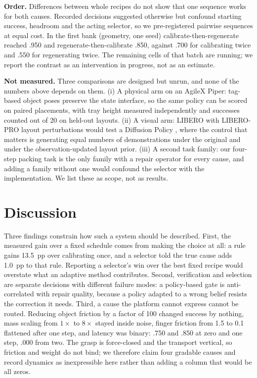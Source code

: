 \documentclass[conference]{IEEEtran}
\begin{document}
\textbf{Order.} Differences between whole recipes do not show that one sequence works for both causes. Recorded decisions suggested otherwise but confound starting success, headroom and the acting selector, so we pre-registered pairwise sequences at equal cost. In the first bank (geometry, one seed) calibrate-then-regenerate reached .950 and regenerate-then-calibrate .850, against .700 for calibrating twice and .550 for regenerating twice. The remaining cells of that batch are running; we report the contrast as an intervention in progress, not as an estimate.

\textbf{Not measured.} Three comparisons are designed but unrun, and none of the numbers above depends on them. (i) A physical arm on an AgileX Piper: tag-based object poses preserve the state interface, so the same policy can be scored on paired placements, with tray height measured independently and successes counted out of 20 on held-out layouts. (ii) A visual arm: LIBERO with LIBERO-PRO layout perturbations \cite{libero,liberopro} would test a Diffusion Policy \cite{chi2023diffusion}, where the control that matters is generating equal numbers of demonstrations under the original and under the observation-updated layout prior. (iii) A second task family: our four-step packing task is the only family with a repair operator for every cause, and adding a family without one would confound the selector with the implementation. We list these as scope, not as results.

\section{Discussion}
Three findings constrain how such a system should be described. First, the measured gain over a fixed schedule comes from making the choice at all: a rule gains 13.5~pp over calibrating once, and a selector told the true cause adds 1.0~pp to that rule. Reporting a selector's win over the best fixed recipe would overstate what an adaptive method contributes. Second, verification and selection are separate decisions with different failure modes: a policy-based gate is anti-correlated with repair quality, because a policy adapted to a wrong belief resists the correction it needs. Third, a cause the platform cannot express cannot be routed. Reducing object friction by a factor of 100 changed success by nothing, mass scaling from $1\times$ to $8\times$ stayed inside noise, finger friction from 1.5 to 0.1 flattened after one step, and latency was binary: .750 and .850 at zero and one step, .000 from two. The grasp is force-closed and the transport vertical, so friction and weight do not bind; we therefore claim four gradable causes and record dynamics as inexpressible here rather than adding a column that would be all zeros.
\end{document}
